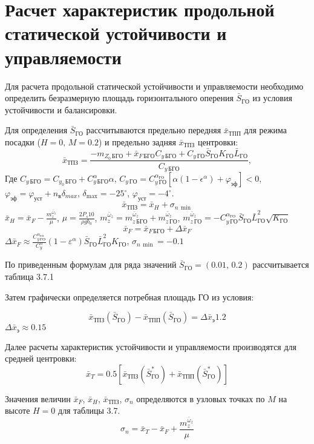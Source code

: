 \section{Расчет характеристик продольной статической устойчивости и
управляемости}

Для расчета продольной статической устойчивости и управляемости
необходимо определить безразмерную площадь горизонтального оперения
$\bar{S}_{ГО}$ из условия устойчивости и
балансировки.

Для определения $\bar{S}_{ГО}$ рассчитываются
предельно передняя $\bar{x}_{ТПП}$ для режима
посадки ($H=0,\, M=0.2$) и предельно задняя
$\bar{x}_{ТПЗ}$ центровки:
\[
    \bar{x}_{ТПЗ} = \frac{-m_{Z_0\, БГО} + \bar{x}_{F\, БГО}C_{y\, БГО}+ 
    C_{y\, ГО} \bar{S}_{ГО} K_{ГО} \bar{L}_{ГО}}{C_{y\, БГО}},
\]
Где $C_{y \, БГО} = C_{y_0\,{БГО}} + C_{y\, БГО}^\alpha \alpha$, 
$C_{y\, ГО} = C_{y\, ГО}^{\alpha_{ГО}} \left[ \alpha(1-\epsilon^\alpha) + 
\varphi_{эф}\right] < 0$, $\varphi_{эф} = \varphi_{уст} + n_в \delta_{max}$,
$\delta_{\max} = -25^\circ$, $\varphi_{уст} = -4^\circ$. 
\[
    \bar{x}_{ТПЗ} = \bar{x}_{H} + \sigma_{n\, \min}
\]
$\bar{x}_{H} = \bar{x}_F - \frac{m_z^{\bar{\omega}_z}}{\mu}$, $\mu = \frac{2 P_s 10 }{\rho g b_a}$,
$m_z^{\bar{\omega}_z} = m_{z\, БГО}^{\bar{\omega}_z}+m_{z\, ГО}^{\bar{\omega}_z}$,
$m_{z\, ГО}^{\bar{\omega}_z} = - C_{y\, {ГО}}^{\alpha_{ГО}} \bar{S}_{ГО} \bar{L}_{ГО}^2
\sqrt{K_{ГО}}$
\[
    \bar{x}_F = \bar{x}_{F\, БГО} + \Delta \bar{x}_F
\]
$ \Delta \bar{x}_F \approx \frac{C_{y\, ГО}^{\alpha_{ГО}} }{C_{y}^\alpha}
(1-\varepsilon^\alpha)\bar{S}_{ГО} \bar{L}_{ГО}^2
K_{ГО}$, $\sigma_{n\, \min} = -0.1$

По приведенным формулам для ряда значений
$\bar{S}_{ГО} = (0.01,\, 0.2)$ рассчитывается таблица
3.7.1

Затем графически определяется потребная площадь ГО из условия:

\[
    \bar{x}_{ТПЗ}(\bar{S}_{ГО}) - \bar{x}_{ТПП}(\bar{S}_{ГО}) = \Delta \bar{x}_{э} 1.2 
\]
$\Delta \bar{x}_{э} \approx 0.15$


Далее расчеты характеристик устойчивости и управляемости производятся
для средней центровки: 
\[
    \bar{x}_{T} = 0.5 \left[  \bar{x}_{ТПЗ}(\bar{S}_{ГО}^*) + \bar{x}_{ТПП}(\bar{S}_{ГО}^*) \right] 
\]

Значения величин $\bar{x}_F$, $\bar{x}_H$, $\bar{x}_{ТПЗ}$, $\sigma_n$ определяются в
узловых точках по $M$ на высоте $H=0$ для таблицы 3.7.
\[
    \sigma_n = \bar{x}_{T} - \bar{x}_{F} + \frac{m_z^{\bar{\omega}_z}}{\mu}
\]

